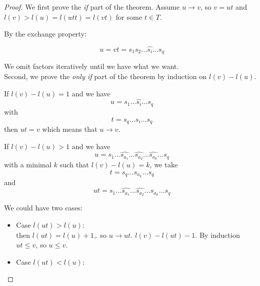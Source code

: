 \begin{proof}
We first prove the \emph{if} part of the theorem. Assume $u \to v$, so $v = ut$ and $l(v) > l(u) = l(utt) = l(vt)$ for some $t \in T$.

By the exchange property:

\begin{equation}
u = vt = s_1s_2\dots \hat{s_i} \dots s_q
\end{equation}

We omit factors iteratively until we have what we want.\\

Second, we prove the \emph{only if} part of the theorem by induction on $l(v) - l(u)$.

If $l(v)-l(u) = 1$ and we have
\begin{equation}
  u = s_1 \dots \hat{s_i} \dots s_q
\end{equation}
with
\begin{equation}
  t = s_q \dots s_i \dots s_q
\end{equation} then $ut = v$ which means that $u \to v$.

If $l(v) - l(u) > 1$ and we have
\begin{equation}
  u = s_1 \dots \hat{s_{a_1}} \dots \hat{s_{a_2}} \dots \hat{s_{a_k}} \dots s_q
\end{equation}
with a minimal $k$ such that $l(v) - l(u) = k$, we take
\begin{equation}
  t = s_q \dots s_{a_k} \dots s_q
\end{equation}
and
\begin{equation}
  ut = s_1 \dots \hat{s_{a_1}} \dots \hat{s_{a_2}} \dots s_{a_k} \dots s_q
\end{equation}


We could have two cases:

\begin{itemize}
  \item Case $l(ut) > l(u)$: \\

  then $l(ut) = l(u) +1$,. so $u \to ut$. $l(v)-l(ut) -1$. By induction $ut \leq v$, so $u \leq v$.

  \item Case $l(ut) < l(u)$: \\


\end{itemize}
\end{proof}
